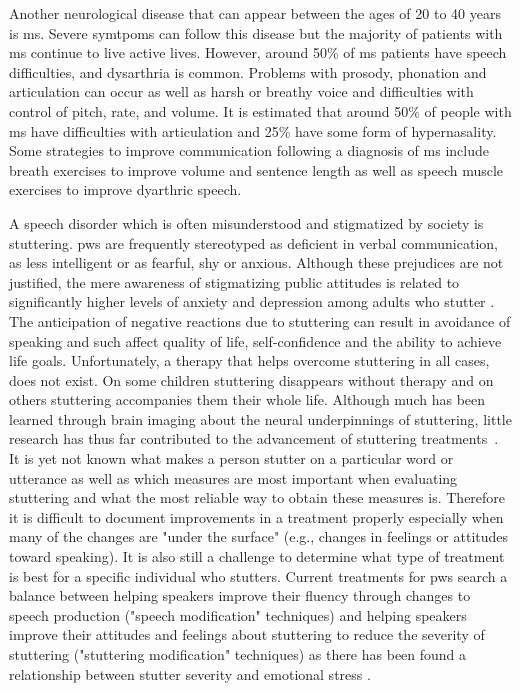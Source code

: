 Another neurological disease that can appear between the ages of 20 to 40 years is \gls{ms}. Severe symtpoms can follow this disease but the majority of patients with \gls{ms} continue to live active lives. However, around 50\% of \gls{ms} patients have speech difficulties, and \gls{dysarthria} is common. 
Problems with prosody, phonation and articulation can occur as well as harsh or breathy voice and difficulties with control of pitch, rate, and volume. It is estimated that around 50\% of people with \gls{ms} have difficulties with
articulation and 25\% have some form of hypernasality. Some strategies to improve communication following a diagnosis of \gls{ms} include breath exercises to improve volume and sentence length as well as speech muscle exercises to improve dyarthric speech. \cite{communicationDifficulties}


A speech disorder which is often misunderstood and stigmatized by society is \gls{stuttering}. \gls{pws} are frequently stereotyped as deficient in verbal communication, as less intelligent or as fearful, shy or anxious. Although these prejudices are not justified, the mere awareness of stigmatizing public attitudes is related to significantly higher levels of anxiety and depression among adults who stutter \cite{Boyle2016}. The anticipation of negative reactions due to stuttering can result in avoidance of speaking and such affect quality of life, self-confidence and the ability to achieve life goals. Unfortunately, a therapy that helps overcome stuttering in all cases, does not exist. On some children stuttering disappears without therapy and on others stuttering accompanies them their whole life. Although much has been learned through brain imaging about the neural underpinnings of stuttering, little research has thus far contributed to the advancement of stuttering treatments~\cite{Ingham2017}.
It is yet not known what makes a person stutter on a particular word or utterance as well as which measures are most important when evaluating stuttering and what the most reliable way to obtain these measures is. Therefore it is difficult to document improvements in a treatment properly especially when many of the changes are "under the surface" (e.g., changes in feelings or attitudes toward speaking). It is also still a challenge to determine what type of treatment is best for a specific individual who stutters. Current treatments for \gls{pws} search a balance between helping speakers improve their fluency through changes to speech production ("speech modification" techniques) and helping speakers improve their attitudes and feelings about stuttering to reduce the severity of stuttering ("stuttering modification" techniques) as there has been found a relationship between stutter severity and emotional stress \cite{Choi2016,Smith2017,Vanryckeghem2001,Alm2015}. 

